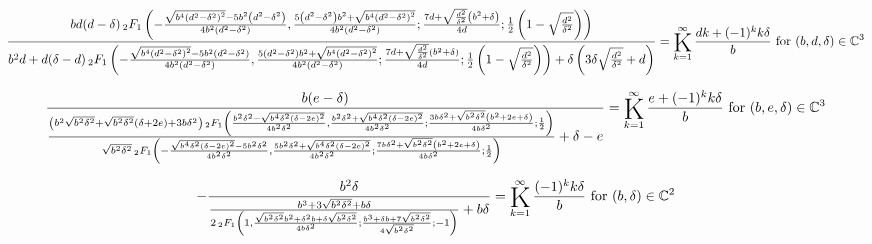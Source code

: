\documentclass{article}
\newcommand{\bigK}{\mathop{\raisebox{-5pt}{\huge K}}}
\begin{document}
\[\frac{b d (d-\delta ) \, _2F_1\left(-\frac{\sqrt{b^4 \left(d^2-\delta ^2\right)^2}-5 b^2 \left(d^2-\delta ^2\right)}{4 b^2 \left(d^2-\delta ^2\right)},\frac{5 \left(d^2-\delta ^2\right) b^2+\sqrt{b^4 \left(d^2-\delta ^2\right)^2}}{4 b^2 \left(d^2-\delta ^2\right)};\frac{7 d+\sqrt{\frac{d^2}{\delta ^2}} \left(b^2+\delta \right)}{4 d};\frac{1}{2} \left(1-\sqrt{\frac{d^2}{\delta ^2}}\right)\right)}{b^2 d+d (\delta -d) \, _2F_1\left(-\frac{\sqrt{b^4 \left(d^2-\delta ^2\right)^2}-5 b^2 \left(d^2-\delta ^2\right)}{4 b^2 \left(d^2-\delta ^2\right)},\frac{5 \left(d^2-\delta ^2\right) b^2+\sqrt{b^4 \left(d^2-\delta ^2\right)^2}}{4 b^2 \left(d^2-\delta ^2\right)};\frac{7 d+\sqrt{\frac{d^2}{\delta ^2}} \left(b^2+\delta \right)}{4 d};\frac{1}{2} \left(1-\sqrt{\frac{d^2}{\delta ^2}}\right)\right)+\delta  \left(3 \delta  \sqrt{\frac{d^2}{\delta ^2}}+d\right)}=\bigK_{k=1}^{\infty}\frac{d k+(-1)^k k \delta }{b}\text{ for }(b,d,\delta )\in \mathbb{C}^3\] 

\[\frac{b (e-\delta )}{\frac{\left(b^2 \sqrt{b^2 \delta ^2}+\sqrt{b^2 \delta ^2} (\delta +2 e)+3 b \delta ^2\right) \, _2F_1\left(\frac{b^2 \delta ^2-\sqrt{b^4 \delta ^2 (\delta -2 e)^2}}{4 b^2 \delta ^2},\frac{b^2 \delta ^2+\sqrt{b^4 \delta ^2 (\delta -2 e)^2}}{4 b^2 \delta ^2};\frac{3 b \delta ^2+\sqrt{b^2 \delta ^2} \left(b^2+2 e+\delta \right)}{4 b \delta ^2};\frac{1}{2}\right)}{\sqrt{b^2 \delta ^2} \, _2F_1\left(-\frac{\sqrt{b^4 \delta ^2 (\delta -2 e)^2}-5 b^2 \delta ^2}{4 b^2 \delta ^2},\frac{5 b^2 \delta ^2+\sqrt{b^4 \delta ^2 (\delta -2 e)^2}}{4 b^2 \delta ^2};\frac{7 b \delta ^2+\sqrt{b^2 \delta ^2} \left(b^2+2 e+\delta \right)}{4 b \delta ^2};\frac{1}{2}\right)}+\delta -e}=\bigK_{k=1}^{\infty}\frac{e+(-1)^k k \delta }{b}\text{ for }(b,e,\delta )\in \mathbb{C}^3\] 

\[-\frac{b^2 \delta }{\frac{b^3+3 \sqrt{b^2 \delta ^2}+b \delta }{2 \, _2F_1\left(1,\frac{\sqrt{b^2 \delta ^2} b^2+\delta ^2 b+\delta  \sqrt{b^2 \delta ^2}}{4 b \delta ^2};\frac{b^3+\delta  b+7 \sqrt{b^2 \delta ^2}}{4 \sqrt{b^2 \delta ^2}};-1\right)}+b \delta }=\bigK_{k=1}^{\infty}\frac{(-1)^k k \delta }{b}\text{ for }(b,\delta )\in \mathbb{C}^2\] 
\end{document}
